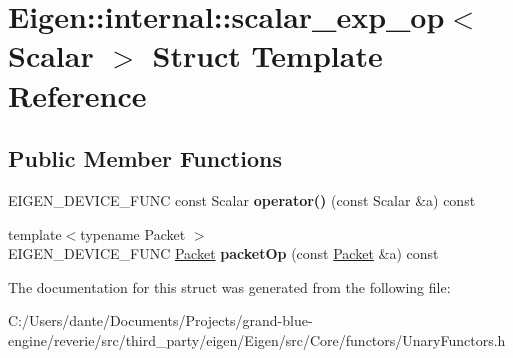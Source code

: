 \hypertarget{struct_eigen_1_1internal_1_1scalar__exp__op}{}\section{Eigen\+::internal\+::scalar\+\_\+exp\+\_\+op$<$ Scalar $>$ Struct Template Reference}
\label{struct_eigen_1_1internal_1_1scalar__exp__op}
\subsection*{Public Member Functions}
\begin{DoxyCompactItemize}
\item 
\mbox{\label{struct_eigen_1_1internal_1_1scalar__exp__op_ad942720c55d82955688f907940521662}} 
E\+I\+G\+E\+N\+\_\+\+D\+E\+V\+I\+C\+E\+\_\+\+F\+U\+NC const Scalar {\bfseries operator()} (const Scalar \&a) const
\item 
\mbox{\label{struct_eigen_1_1internal_1_1scalar__exp__op_a171b257ff73c7bc17cb153665de38dc4}} 
{\footnotesize template$<$typename Packet $>$ }\\E\+I\+G\+E\+N\+\_\+\+D\+E\+V\+I\+C\+E\+\_\+\+F\+U\+NC \mbox{\hyperlink{union_eigen_1_1internal_1_1_packet}{Packet}} {\bfseries packet\+Op} (const \mbox{\hyperlink{union_eigen_1_1internal_1_1_packet}{Packet}} \&a) const
\end{DoxyCompactItemize}


The documentation for this struct was generated from the following file\+:\begin{DoxyCompactItemize}
\item 
C\+:/\+Users/dante/\+Documents/\+Projects/grand-\/blue-\/engine/reverie/src/third\+\_\+party/eigen/\+Eigen/src/\+Core/functors/Unary\+Functors.\+h\end{DoxyCompactItemize}
